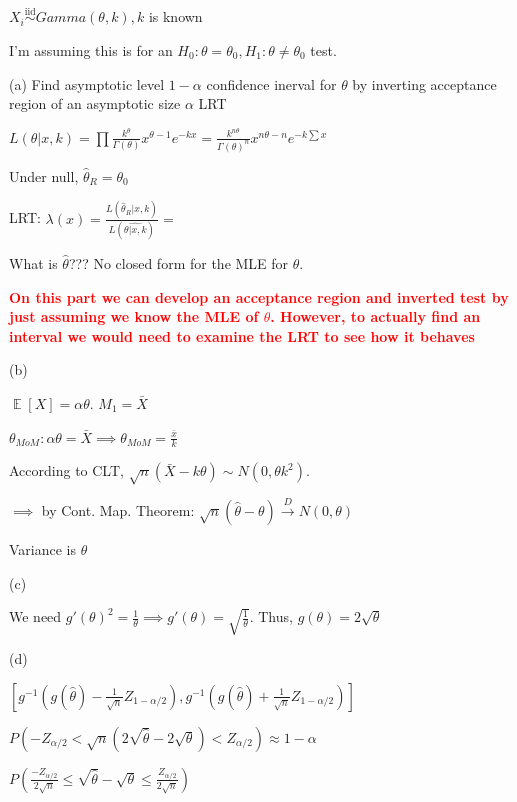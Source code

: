 \documentclass{article}
\DeclareMathOperator{\EX}{\mathbb{E}} %
\newcommand{\dto}{\overset{D}{\to}}
\let\Oldsum=\sum
\let\Oldprod=\prod
\renewcommand{\sum}{\Oldsum\limits}
\renewcommand{\prod}{\Oldprod\limits}
\newcommand{\iiddist}{\overset{\mathrm{iid}}{\sim}}
\newcommand{\boldred}[1]{\textbf{\textcolor{red}{#1}}}
\begin{document}
\section{}

$X_i \iiddist Gamma(\theta, k), k$ is known

I'm assuming this is for an $H_0: \theta = \theta_0, H_1: \theta \neq \theta_0$ test. 

(a) Find asymptotic level $1-\alpha$ confidence inerval for $\theta$ by inverting acceptance region of an asymptotic size $\alpha$ LRT

$L(\theta|x,k) = \prod \frac{k^\theta}{\Gamma(\theta)}x^{\theta - 1}e^{-kx} = \frac{k^{n\theta}}{\Gamma(\theta)^n}x^{n\theta - n}e^{-k \sum x}$

Under null, $\hat{\theta}_R = \theta_0$

LRT: $\lambda(x) = \frac{L(\hat{\theta}_R|x,k)}{L(\hat{\theta|x,k})} = $

What is $\hat{\theta}$??? No closed form for the MLE for $\theta$.

\boldred{On this part we can develop an acceptance region and inverted test by just assuming we know the MLE of $\theta$. However, to actually find an interval we would need to examine the LRT to see how it behaves}

(b)

$\EX[X] = \alpha \theta$. $M_1 = \bar{X}$

$\theta_{MoM}: \alpha \theta = \bar{X} \implies \theta_{MoM} = \frac{\bar{x}}{k}$

According to CLT, $\sqrt{n}(\bar{X} - k\theta) \sim N(0, \theta k^2)$. 

$\implies$ by Cont. Map. Theorem: $\sqrt{n}(\hat{\theta} - \theta) \dto N(0, \theta)$

Variance is $\theta$

(c)

We need $g'(\theta)^2 = \frac{1}{\theta} \implies g'(\theta) = \sqrt{\frac{1}{\theta}}$. Thus, $g(\theta) = 2\sqrt{\theta}$

(d)

$[g^{-1}(g(\hat{\theta}) - \frac{1}{\sqrt{n}}Z_{1-\alpha/2}), g^{-1}(g(\hat{\theta}) + \frac{1}{\sqrt{n}}Z_{1-\alpha/2})]$

$P(-Z_{\alpha/2} < \sqrt{n}(2\sqrt{\hat{\theta}} - 2\sqrt{\theta}) < Z_{\alpha/2}) \approx 1-\alpha$

$P(\frac{-Z_{\alpha/2}}{2\sqrt{n}} \le \sqrt{\hat{\theta}} - \sqrt{\theta} \le \frac{Z_{\alpha/2}}{2\sqrt{n}})$
\end{document}
